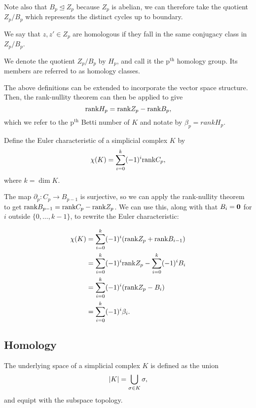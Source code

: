Note also that $B_p \unlhd Z_p$ because $Z_p$ is abelian, we can therefore take the quotient $Z_p / B_p$ which represents the distinct cycles up to boundary.   

\begin{definition}
    We say that $z, z' \in Z_p$ are homologous if they fall in the same conjugacy class in $Z_p / B_p$.
\end{definition}

We denote the quotient $Z_p / B_p$ by $H_p$, and call it the p$^{\text{th}}$ homology group. Its members are referred to as homology classes.

The above definitions can be extended to incorporate the vector space structure. Then, the rank-nullity theorem can then be applied to give 
$$
\textrm{rank} H_p = \textrm{rank} Z_p - \textrm{rank} B_p,
$$
which we refer to the p$^{\text{th}}$ Betti number of $K$ and notate by $\beta_p = rank H_p$.

\begin{definition}
    Define the Euler characteristic of a simplicial complex $K$ by 
    $$
    \chi(K) = \sum_{i=0}^k (-1)^i \textrm{rank} C_p,
    $$
    where $k = \dim K$.
\end{definition}

The map $\partial_p: C_p \rightarrow B_{p-1}$ is surjective, so we can apply the rank-nullity theorem to get $\textrm{rank} B_{p-1} = \textrm{rank} C_p - \textrm{rank} Z_p$. We can use this, along with that $B_i = \mathbf{0}$ for $i$ outside $\{0, \ldots, k-1\}$, to rewrite the Euler characteristic:

\begin{align*}
    \chi(K) &= \sum_{i=0}^k (-1)^i (\textrm{rank} Z_p + \textrm{rank} B_{i-1}) \\
            &= \sum_{i=0}^k (-1)^i \textrm{rank} Z_p - \sum_{i=0}^k (-1)^i B_{i} \\
            &= \sum_{i=0}^k (-1)^i (\textrm{rank} Z_p - B_{i}) \\
            &= \sum_{i=0}^k (-1)^i \beta_i.
\end{align*}


\subsection{Homology}

\begin{definition}
    The underlying space of a simplicial complex $K$ is defined as the union
    $$
    \lvert K\rvert = \bigcup_{\sigma \in K} \sigma,
    $$
    and equipt with the subspace topology.
\end{definition}

